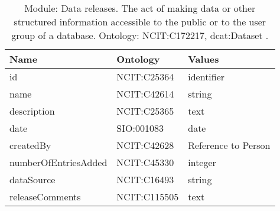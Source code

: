 \documentclass{article}
\begin{document}
\begin{table}[htb]
\begin{tabular}{lll}
Name & Ontology & Values \\
\hline
id & NCIT:C25364  & identifier \\
name & NCIT:C42614  & string \\
description & NCIT:C25365  & text \\
date & SIO:001083  & date \\
createdBy & NCIT:C42628  & Reference to Person \\
numberOfEntriesAdded & NCIT:C45330  & integer \\
dataSource & NCIT:C16493  & string \\
releaseComments & NCIT:C115505  & text \\
\hline
\end{tabular}
\caption[Module: Data releases]{\label{table:table4} Module: Data releases. The act of making data or other structured information accessible to the public or to the user group of a database. Ontology: NCIT:C172217, dcat:Dataset . }
\end{table}
\end{document}
